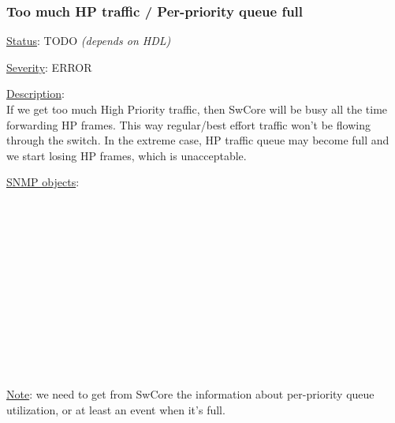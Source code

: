 \subsubsection{\bf Too much HP traffic / Per-priority queue full}
		\label{fail:data:too_much_HP}
		\begin{pck_descr}
			\item [] \underline{Status}: TODO \emph{(depends on HDL)}
			\item [] \underline{Severity}: ERROR
			\item [] \underline{Description}:\\
				If we get too much High Priority traffic, then SwCore will be busy all
				the time forwarding HP frames. This way regular/best effort traffic
				won't be flowing through the switch. In the extreme case, HP traffic
				queue may become full and we start losing HP frames, which is
				unacceptable.
			\item [] \underline{SNMP objects}:\\
				{\footnotesize
				 \\
				 \\
				 \\
				 \\
				 \\
				 \\
				 \\
				 \\
				 \\
				 \\
				\\
				\\
				 }
			\item [] \underline{Note}: we need to get from SwCore the information
				about per-priority queue utilization, or at least an event when it's
				full.
		\end{pck_descr}

